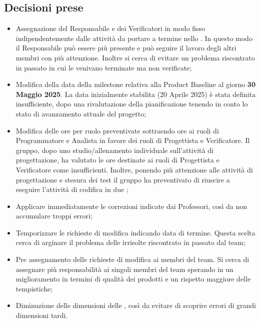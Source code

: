 \documentclass[a4paper, 12pt]{article}
\begin{document}
\subsection{Decisioni prese}
\begin{itemize}
    \item Assegnazione del Responsabile e dei Verificatori in modo fisso indipendentemente dalle attività da portare a termine nello .
    In questo modo il Responsabile può essere più presente e può seguire il lavoro degli altri membri con più attenzione.
    Inoltre si cerca di evitare un problema riscontrato in passato in cui le  venivano terminate ma non verificate;

    \item Modifica della data della milestone relativa alla Product Baseline al giorno \textbf{30 Maggio 2025}.
    La data inizialmente stabilita (20 Aprile 2025) è stata definita insufficiente, dopo una rivalutazione della pianificazione tenendo in conto lo stato di avanzamento attuale del progetto; 

    \item Modifica delle ore per ruolo preventivate sottraendo ore ai ruoli di Programmatore e Analista in favore dei ruoli di Progettista e Verificatore.
    Il gruppo, dopo uno studio/allenamento individuale sull'attività di progettazione, ha valutato le ore destinate ai ruoli di Progettista e Verificatore come insufficienti.
    Inoltre, ponendo più attenzione alle attività di progettazione e stesura dei test il gruppo ha preventivato di riuscire a eseguire l'attività di codifica in due ;  

    \item Applicare immediatamente le correzioni indicate dai Professori, così da non accumulare troppi errori;
    
    \item Temporizzare le richieste di modifica indicando data di termine.
    Questa scelta cerca di arginare il problema delle  irrisolte riscontrato in passato dal team;

    \item Pre assegnamento delle richieste di modifica ai membri del team. 
    Si cerca di assegnare più responsabilità ai singoli membri del team sperando in un miglioramento in termini di qualità dei prodotti e un rispetto maggiore delle tempistiche;

    \item Diminuzione delle dimensioni delle , così da evitare di scoprire errori di grandi dimensioni tardi. 
\end{itemize}
\end{document}
